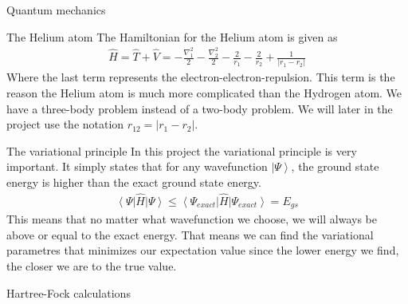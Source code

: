 \documentclass[a4paper, 12pt, titlepage]{article}
\begin{document}
\begin{section}{Quantum mechanics}
 \begin{subsection}{The Helium atom}
  The Hamiltonian for the Helium atom is given as
  \begin{align}
  	\hat H = \hat T + \hat V = -\frac{\nabla_1^2}{2} -\frac{\nabla_2^2}{2} - \frac{2}{r_1} - \frac{2}{r_2} + \frac{1}{|r_1 - r_2|}
  \end{align}
  Where the last term represents the electron-electron-repulsion. This term is the reason the Helium atom is much more complicated than the Hydrogen atom. We have a three-body problem instead of a two-body problem. We will later in the project use the notation $r_{12} = |r_1 - r_2|$.
 \end{subsection}

 \begin{subsection}{The variational principle}
 	In this project the variational principle is very important. It simply states that for any wavefunction $\left| \Psi \right>$, the ground state energy is higher than the exact ground state energy. 
 	\begin{align}
 		\left< \Psi \right| \hat H \left| \Psi \right> \leq \left< \Psi_{exact} \right| \hat H \left| \Psi_{exact} \right> = E_{gs}
 	\end{align}
 	This means that no matter what wavefunction we choose, we will always be above or equal to the exact energy. That means we can find the variational parametres that minimizes our expectation value since the lower energy we find, the closer we are to the true value.
 \end{subsection}

 \begin{subsection}{Hartree-Fock calculations}
 	
 \end{subsection}

\end{section}
\newpage
\end{document}
